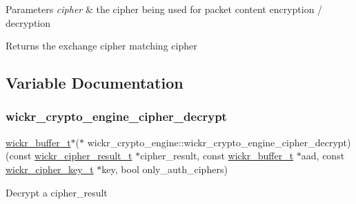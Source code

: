 \begin{DoxyParams}{Parameters}
{\em cipher} & the cipher being used for packet content encryption / decryption \\
\hline
\end{DoxyParams}
\begin{DoxyReturn}{Returns}
the exchange cipher matching \textquotesingle{}cipher\textquotesingle{} 
\end{DoxyReturn}


\subsection{Variable Documentation}
\mbox{\label{group__wickr__crypto__engine_ga459ef821cc40edb5e3c9ce1d571ddc00}} 
\subsubsection{\texorpdfstring{wickr\_crypto\_engine\_cipher\_decrypt}{wickr\_crypto\_engine\_cipher\_decrypt}}
{\footnotesize\ttfamily \mbox{\hyperlink{structwickr__buffer}{wickr\+\_\+buffer\+\_\+t}}$\ast$($\ast$ wickr\+\_\+crypto\+\_\+engine\+::wickr\+\_\+crypto\+\_\+engine\+\_\+cipher\+\_\+decrypt) (const \mbox{\hyperlink{structwickr__cipher__result}{wickr\+\_\+cipher\+\_\+result\+\_\+t}} $\ast$cipher\+\_\+result, const \mbox{\hyperlink{structwickr__buffer}{wickr\+\_\+buffer\+\_\+t}} $\ast$aad, const \mbox{\hyperlink{structwickr__cipher__key}{wickr\+\_\+cipher\+\_\+key\+\_\+t}} $\ast$key, bool only\+\_\+auth\+\_\+ciphers)}

Decrypt a cipher\+\_\+result


